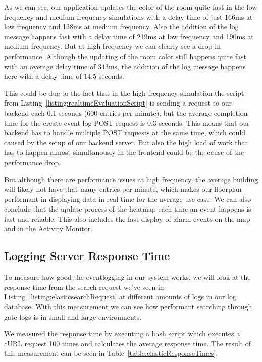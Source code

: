 As we can see, our application updates the color of the room quite fast in the low frequency and medium frequency simulations with a delay time of just 166ms at low frequency and 138ms at medium frequency.
Also the addition of the log message happens fast with a delay time of 219ms at low frequency and 190ms at medium frequency.
But at high frequency we can clearly see a drop in performance. Although the updating of the room color still happens quite fast with an average delay time of 343ms, the addition of the log message happens here with a delay time of 14.5 seconds. 

This could be due to the fact that in the high frequency simulation the script from Listing~\ref{listing:realtimeEvaluationScript} is sending a request to our backend each 0.1 seconds (600 entries per minute), but the average completion time for the create event log POST request is 0.3 seconds. This means that our backend has to handle multiple POST requests at the same time, which could caused by the setup of our backend server. But also the high load of work that has to happen almost simultanously in the frontend could be the cause of the performance drop. 

But although there are performance issues at high frequency, the average building will likely not have that many entries per minute, which makes our floorplan performant in displaying data in real-time for the average use case. We can also conclude that the update process of the heatmap each time an event happens is fast and reliable. This also includes the fast display of alarm events on the map and in the Activity Monitor.

\subsection{Logging Server Response Time}

To measure how good the eventlogging in our system works, we will look at the response time from the search request we've seen in Listing~\ref{listing:elasticsearchRequest}
at different amounts of logs in our log database. With this measurement we can see how performant searching through gate logs is in small and large environments. 

We measured the response time by executing a bash script which executes a cURL request 100 times and calculates the average response time. 
The result of this measurement can be seen in Table~\ref{table:elasticResponseTimes}.
 
